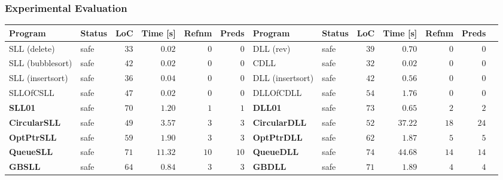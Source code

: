 \documentclass{beamer}
\newcommand{\hcol}[1]{yellow!20!orange!20}
\newcommand{\scol}[1]{blue!40}
\newcommand{\safe}[0]{safe}
\begin{document}
\begin{frame}
\frametitle{Experimental Evaluation}

	\begin{center}
	\begin{adjustbox}{max height=\textheight, max width=\textwidth}
	\begin{tabular}{| l | l | r | r | r | r || l | l | r | r | r | r | r |}
        \hline
		Program & Status & LoC & Time [s] & Refnm& Preds & Program & Status & LoC & Time [s] & Refnm & Preds \\
        \hline
        \hline
		SLL (delete) & \cellcolor{\scol{}} \safe & $33$ & $0.02$ &  $0$ & $0$ & DLL (rev) & \cellcolor{\scol{}} \safe & $39$ &  $0.70$ & $0$  & $0$ \\
        \hline
		SLL (bubblesort) & \cellcolor{\scol{}} \safe & $42$ & $0.02$ &  $0$ & $0$ & CDLL & \cellcolor{\scol{}} \safe & $32$ &  $0.02$  & $0$  & $0$ \\
        \hline
		SLL (insertsort) & \cellcolor{\scol{}} \safe & $36$ & $0.04$ & $0$ & $0$ & DLL (insertsort) & \cellcolor{\scol{}} \safe & $42$ &  $0.56$  & $0$  & $0$ \\
        \hline
		SLLOfCSLL & \cellcolor{\scol{}} \safe & $47$ & $0.02$ & $0$ & $0$ & DLLOfCDLL & \cellcolor{\scol{}} \safe & $54$ &  $1.76$  & $0$  & $0$ \\
        \hline
		\rowcolor{\hcol{}}
		\textbf{SLL01}    & \cellcolor{\scol{}} \safe & $70$ & $1.20$   &  $1$ & $1$ & \textbf{DLL01} & \cellcolor{\scol{}} \safe & $73$ &  $0.65$  & $2$  & $2$ \\
        \hline
		\rowcolor{\hcol{}}
		\textbf{CircularSLL} & \cellcolor{\scol{}} \safe & $49$ & $3.57$   &  $3$  & $3$ & \textbf{CircularDLL} & \cellcolor{\scol{}} \safe  & $52$ &  $37.22$ & $18$ & $24$ \\
        \hline
		\rowcolor{\hcol{}}
		\textbf{OptPtrSLL}   & \cellcolor{\scol{}} \safe & $59$ & $1.90$ & $3$ & $3$ & \textbf{OptPtrDLL} &\cellcolor{\scol{}} \safe & $62$ &  $1.87$  & $5$ & $5$ \\
        \hline
		\rowcolor{\hcol{}}
		\textbf{QueueSLL}    & \cellcolor{\scol{}} \safe & $71$ & $11.32$  &  $10$ & $10$ & \textbf{QueueDLL} &  \cellcolor{\scol{}}  \safe  & $74$ &  $44.68$ & $14$ & $14$ \\
		\rowcolor{\hcol{}}
        \hline
		\textbf{GBSLL}       & \cellcolor{\scol{}} \safe & $64$ & $0.84$   &  $3$ & $3$ & \textbf{GBDLL} &  \cellcolor{\scol{}}  \safe & $71$ &  $1.89$  & $4$ & $4$ \\

\end{tabular}
\end{adjustbox}
\end{center}
\end{frame}
\end{document}
